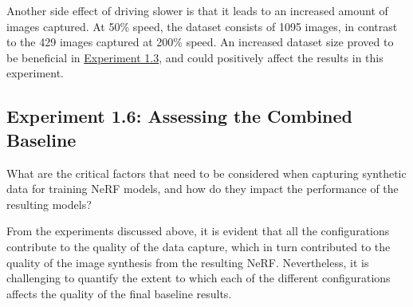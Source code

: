 Another side effect of driving slower is that it leads to an increased amount of images captured. At 50\% speed, the dataset consists of 1095 images, in contrast to the 429 images captured at 200\% speed. An increased dataset size proved to be beneficial in \hyperref[sec:exp-number-of-frames]{Experiment 1.3}, and could positively affect the results in this experiment.


























\subsection{Experiment 1.6: Assessing the Combined Baseline}
\begin{description}[leftmargin=!,labelwidth=\widthof{RQ 1:}]
\item[\textbf{RQ 1:}] What are the critical factors that need to be considered when capturing synthetic data for training NeRF models, and how do they impact the performance of the resulting models?
\end{description}


From the experiments discussed above, it is evident that all the configurations contribute to the quality of the data capture, which in turn contributed to the quality of the image synthesis from the resulting NeRF. Nevertheless, it is challenging to quantify the extent to which each of the different configurations affects the quality of the final baseline results.

